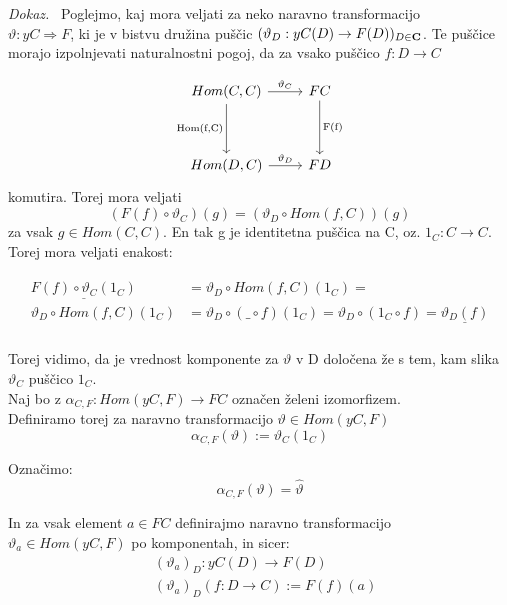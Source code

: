 \documentclass[12pt,a4paper]{book}
\theoremstyle{definition}
\theoremstyle{plain}
\newenvironment{dokaz}{\emph{Dokaz.}\ }{\hspace{\fill}{$\Box$}}
\theoremstyle{definition}
\theoremstyle{remark}
\begin{document}
\begin{dokaz}
Poglejmo, kaj mora veljati za neko naravno transformacijo \\ $\vartheta : yC \Rightarrow F$, ki je v bistvu družina puščic $(\vartheta_D : yC(D) \to F(D))_{D \in \bf{C}}$. Te puščice morajo izpolnjevati naturalnostni pogoj, da za vsako puščico $f : D \to C$

\[ \begin{tikzcd}[row sep=huge]
Hom(C,C) \arrow[r, "\vartheta_C"] \arrow[d, "\text{Hom(f,C)}"'] & FC \arrow[d, "\text{F(f)}"] \\
Hom(D,C) \arrow[r, "\vartheta_D"] & FD
\end{tikzcd} \]
komutira. Torej mora veljati 
$$(F(f) \circ \vartheta_C) (g) = (\vartheta_D \circ Hom(f,C)) (g)$$
za vsak $g \in Hom(C,C)$. En tak g je identitetna puščica na C, oz. $1_C : C \to C$. Torej mora veljati enakost:

\begin{align} \label{eq1}
\begin{split}
\underline{F(f) \circ \vartheta_C(1_C)}& = \vartheta_D \circ Hom(f,C)(1_C) = \\
\vartheta_D \circ Hom(f,C)(1_C)& = \vartheta_D \circ ( \_ \circ f )(1_C) =
\vartheta_D \circ ( 1_C \circ f) = \underline{\vartheta_D(f)}
\end{split}
\end{align}
\\
Torej vidimo, da je vrednost komponente za $\vartheta$ v D določena že s tem, kam slika $\vartheta_C$ puščico $1_C$. \\
Naj bo z $\alpha_{C,F} : Hom(yC,F) \to FC$ označen želeni izomorfizem. \\
Definiramo torej za naravno transformacijo $\vartheta \in Hom(yC,F)$
\begin{equation}
\alpha_{C,F}(\vartheta) := \vartheta_C(1_C)
\end{equation}

Označimo:
\begin{equation}
\boxed{\alpha_{C,F}(\vartheta) = \widehat{\vartheta}}
\end{equation} 

In za vsak element $a \in FC$ definirajmo naravno transformacijo $\vartheta_a \in Hom(yC,F)$ po komponentah, in sicer:
\begin{align}
&(\vartheta_a)_D : yC(D) \to F(D) \\
&(\vartheta_a)_D(f : D \to C) := F(f)(a)
\end{align}


\end{dokaz}
\end{document}

